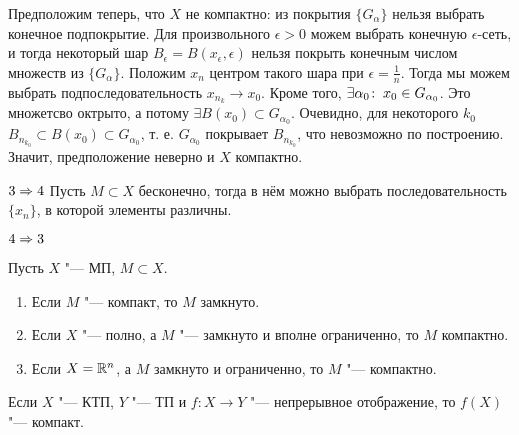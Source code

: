 \documentclass[main]{subfiles}
\begin{document}
\begin{itemproof}
  Предположим теперь, что \( X \) не компактно:
  из покрытия \( \{ G_\alpha \} \) нельзя выбрать конечное
  подпокрытие. Для произвольного \( \epsilon > 0 \)
  можем выбрать конечную \( \epsilon \)-сеть,
  и тогда некоторый шар \( B_\epsilon = B(x_\epsilon, \epsilon) \)
  нельзя покрыть конечным числом множеств из \( \{ G_\alpha \} \).
  Положим \( x_n \) центром такого шара при \( \epsilon = \frac{1}{n} \).
  Тогда мы можем выбрать подпоследовательность
  \( x_{n_k} \to x_0 \). Кроме того, \( \exists \alpha_0 \colon \: x_0 \in G_{\alpha_0} \).
  Это множетсво октрыто, а потому \( \exists B(x_0) \subset G_{\alpha_0} \).
  Очевидно, для некоторого \( k_0 \) \( B_{n_{k_0}} \subset B(x_0)
  \subset G_{\alpha_0} \), т. е. \( G_{\alpha_0} \) покрывает
  \( B_{n_{k_0}} \), что невозможно по построению.
  Значит, предположение неверно и \( X \) компактно.
\item[$3 \Rightarrow 4$]
  Пусть \( M \subset X \) бесконечно, тогда
  в нём можно выбрать последовательность
  \( \{ x_n \} \), в которой элементы различны.
\item[$4 \Rightarrow 3$]
\end{itemproof}

\begin{corollary}
  Пусть \( X \) "--- МП, \( M \subset X \).
  \begin{enumerate}
    \item Если \( M \) "--- компакт, то \( M \) замкнуто.
    \item Если \( X \) "--- полно, а \( M \) "---
      замкнуто и вполне ограниченно, то \( M \) компактно.
    \item Если \( X = \mathbb{R}^n \), а \( M \)
      замкнуто и ограниченно, то \( M \) "--- компактно.
  \end{enumerate}
\end{corollary}

\begin{exercise}
  Если \( X \) "--- КТП, \( Y \) "--- ТП
  и \( f : X \to Y \) "--- непрерывное отображение,
  то \( f(X) \) "--- компакт.
\end{exercise}
\end{document}
